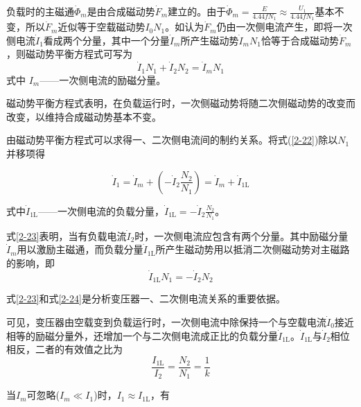 \documentclass{book}
\begin{document}
负载时的主磁通${{\dot{\Phi }}_{m}}$是由合成磁动势${{\dot{F}}_{m}}$建立的。由于${{\dot{\Phi }}_{m}}=\frac{E}{4.44f{{N}_{1}}}\approx \frac{{{U}_{1}}}{4.44f{{N}_{1}}}$基本不变，所以${{\dot{F}}_{m}}$近似等于空载磁动势${{I}_{0}}{{N}_{1}}$。如认为${{\dot{F}}_{m}}$仍由一次侧电流产生，即将一次侧电流${{\dot{I}}_{1}}$看成两个分量，其中一个分量${{\dot{I}}_{m}}$所产生磁动势${{\dot{I}}_{m}}{{N}_{1}}$恰等于合成磁动势${{\dot{F}}_{m}}$，则磁动势平衡方程式可写为
\begin{equation}
{{\dot{I}}_{1}}{{N}_{1}}+{{\dot{I}}_{2}}{{N}_{2}}={{\dot{I}}_{m}}{{N}_{1}}
\label{2-22}
\end{equation}
式中 ${{I}_{m}}$——一次侧电流的励磁分量。

磁动势平衡方程式表明，在负载运行时，一次侧磁动势将随二次侧磁动势的改变而改变，以维持合成磁动势基本不变。

由磁动势平衡方程式可以求得一、二次侧电流间的制约关系。将式(\ref{2-22})除以${{N}_{1}}$并移项得

\begin{equation}
{{\dot{I}}_{1}}={{\dot{I}}_{m}}+\left( -{{{\dot{I}}}_{2}}\frac{{{N}_{2}}}{{{N}_{1}}} \right)={{\dot{I}}_{m}}+{{\dot{I}}_{1\text{L}}}
\label{2-23}
\end{equation}

式中${{\dot{I}}_{1\text{L}}}$——一次侧电流的负载分量，${{\dot{I}}_{1\text{L}}}=-{{\dot{I}}_{2}}\frac{{{N}_{2}}}{{{N}_{1}}}$。

式\eqref{2-23}表明，当有负载电流${{\dot{I}}_{2}}$时，一次侧电流应包含有两个分量。其中励磁分量${{\dot{I}}_{m}}$用以激励主磁通，而负载分量${{\dot{I}}_{1\text{L}}}$所产生磁动势用以抵消二次侧磁动势对主磁路的影响，即
\begin{equation}
{{\dot{I}}_{1\text{L}}}{{N}_{1}}=-{{\dot{I}}_{2}}{{N}_{2}}
\label{2-24}
\end{equation}

式\eqref{2-23}和式\eqref{2-24}是分析变压器一、二次侧电流关系的重要依据。

可见，变压器由空载变到负载运行时，一次侧电流中除保持一个与空载电流${{\dot{I}}_{0}}$接近相等的励磁分量外，还增加一个与二次侧电流成正比的负载分量${{\dot{I}}_{1\text{L}}}$。${{\dot{I}}_{1\text{L}}}$与${{\dot{I}}_{2}}$相位相反，二者的有效值之比为
\begin{equation}
\frac{{{I}_{1\text{L}}}}{{{I}_{2}}}=\frac{{{N}_{2}}}{{{N}_{1}}}=\frac{1}{k}
\label{2-25}
\end{equation}

当${{I}_{m}}$可忽略(${{I}_{m}}\ll {{I}_{1}}$)时，${{I}_{1}}\approx {{I}_{1\text{L}}}$，有
\end{document}
